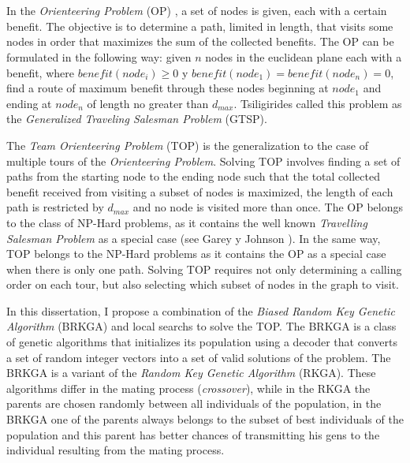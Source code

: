 
\chapter*{\tituloAbstractEn}

\noindent In the \textit{Orienteering Problem} (OP) \cite{Tsiligirides}, a set of nodes is given, each with a certain benefit. The objective is to determine a path, limited in length, that visits some nodes in order that maximizes the sum of the collected benefits. The OP can be formulated in the following way: given $n$ nodes in the euclidean plane each with a benefit, where $benefit(node_i) \geq 0$ y $benefit(node_1) = benefit(node_n) = 0$, find a route of maximum benefit through these nodes beginning at $node_1$ and ending at $node_n$ of length no greater than $d_{max}$. Tsiligirides \cite{Tsiligirides} called this problem as the \textit{Generalized Traveling Salesman Problem} (GTSP).

\bigskip

The \textit{Team Orienteering Problem} (TOP) \cite{ChaoGoldenWasil} is the generalization to the case of multiple tours of the \textit{Orienteering Problem}. Solving TOP involves finding a set of paths from the starting node to the ending node such that the total collected benefit received from visiting a subset of nodes is maximized, the length of each path is restricted by $d_{max}$ and no node is visited more than once. The OP belongs to the class of NP-Hard problems, as it contains the well known \textit{Travelling Salesman Problem} as a special case (see Garey y Johnson \cite{GareyJohnson}). In the same way, TOP belongs to the NP-Hard problems as it contains the OP as a special case when there is only one path. Solving TOP requires not only determining a calling order on each tour, but also selecting which subset of nodes in the graph to visit.

\bigskip

In this dissertation, I propose a combination of the \textit{Biased Random Key Genetic Algorithm} (BRKGA) \cite{Bean} and local searchs to solve the TOP. The BRKGA is a class of genetic algorithms that initializes its population using a decoder that converts a set of random integer vectors into a set of valid solutions of the problem. The BRKGA is a variant of the \textit{Random Key Genetic Algorithm} (RKGA). These algorithms differ in the mating process (\textit{crossover}), while in the RKGA the parents are chosen randomly between all individuals of the population, in the BRKGA one of the parents always belongs to the subset of best individuals of the population and this parent has better chances of transmitting his gens to the individual resulting from the mating process.

